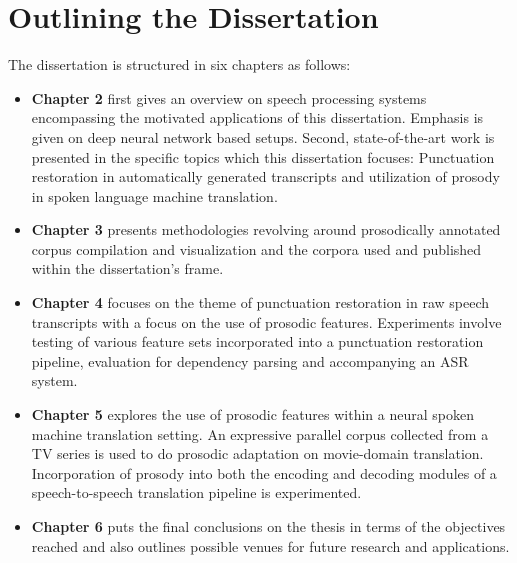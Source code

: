 \section{Outlining the Dissertation}

The dissertation is structured in six chapters as follows:

\begin{itemize}
    \item \textbf{Chapter 2} first gives an overview on speech processing systems encompassing the motivated applications of this dissertation. Emphasis is given on deep neural network based setups. Second, state-of-the-art work is presented in the specific topics which this dissertation focuses: Punctuation restoration in automatically generated transcripts and utilization of prosody in spoken language machine translation. 
    \item \textbf{Chapter 3} presents methodologies revolving around prosodically annotated corpus compilation and visualization and the corpora used and published within the dissertation's frame.
    \item \textbf{Chapter 4} focuses on the theme of punctuation restoration in raw speech transcripts with a focus on the use of prosodic features. Experiments involve testing of various feature sets incorporated into a punctuation restoration pipeline, evaluation for dependency parsing and accompanying an ASR system.
    \item \textbf{Chapter 5} explores the use of prosodic features within a neural spoken machine translation setting. An expressive parallel corpus collected from a TV series is used to do prosodic adaptation on movie-domain translation. Incorporation of prosody into both the encoding and decoding modules of a speech-to-speech translation pipeline is experimented.
    \item \textbf{Chapter 6} puts the final conclusions on the thesis in terms of the objectives reached and also outlines possible venues for future research and applications. 
\end{itemize}


